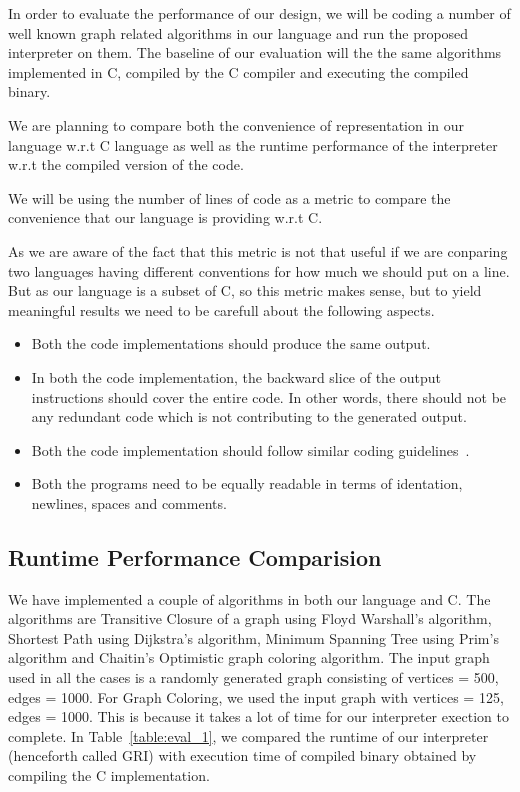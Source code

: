 In order to evaluate the performance of our design, we will be coding a number 
of well known graph related algorithms in our language and run the proposed interpreter on 
them. The baseline of our evaluation will the the same algorithms implemented in 
C,  compiled by the C compiler and executing the compiled binary.

We are planning to compare both the convenience of representation in our 
language w.r.t C language as well as the runtime performance of the interpreter 
w.r.t the compiled version of the code.

We will be using the number of lines of code as a metric to compare the 
convenience that our language is providing w.r.t C. 

As we are aware of the fact that this metric is not that useful if we are 
conparing two languages having different conventions for how much we should put on a line. 
But as our language is a subset of C, so  this metric makes sense, but 
to yield 
meaningful results we need to  be carefull about the following aspects.
\begin{itemize}
  \item Both the code implementations should produce the same output.
  \item In both the code implementation, the backward slice of the output instructions should cover the entire 
  code. In other words, there should not be any redundant code which is not 
  contributing to the generated output. 
  \item Both the code implementation should follow similar coding 
  guidelines~\cite{GNU}.
  \item Both the programs need to be equally readable in terms of identation, 
  newlines, spaces and comments.
\end{itemize}

\subsection{Runtime Performance Comparision}

We have implemented a couple of algorithms in both our language and C. The 
algorithms are Transitive Closure of a graph using Floyd Warshall's algorithm, 
           Shortest Path using Dijkstra's algorithm, Minimum Spanning Tree using 
           Prim's algorithm and Chaitin's Optimistic graph coloring algorithm.
The input graph used in all the cases is a randomly generated graph consisting  of vertices = 500, edges = 1000. 
For Graph Coloring, we used the input graph with vertices = 125, edges = 1000. This is 
because it takes a lot of time for our interpreter exection to complete.
In Table~\ref{table:eval_1}, we compared the runtime of our interpreter 
(henceforth called GRI) with 
execution time of compiled binary obtained by compiling the C implementation.


